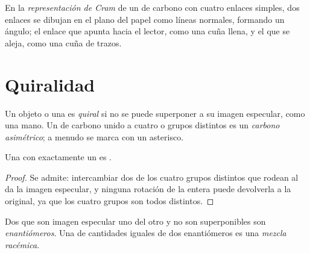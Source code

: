 \begin{definition}\label{def:g12:stereochemistry:cram}
En la \emph{representación de Cram} de un
 de carbono con cuatro enlaces simples, dos enlaces se dibujan en el
plano del papel como líneas normales, formando un ángulo; el enlace que
apunta hacia el lector, como una cuña llena, y el que se aleja, como una
cuña de trazos.
\end{definition}

\section{Quiralidad}

\begin{definition}\label{def:g12:stereochemistry:chiral}
Un objeto o una  es \emph{quiral} si no se puede
superponer a su imagen especular, como una mano. Un  de carbono
unido a cuatro  o grupos distintos es un \emph{carbono
asimétrico}; a menudo se marca con un
asterisco.
\end{definition}

\begin{proposition}\label{prop:g12:stereochemistry:one-carbon}
Una  con exactamente un  es .
\end{proposition}

\begin{proof}
Se admite: intercambiar dos de los cuatro grupos distintos que rodean al
 da la imagen especular, y ninguna rotación de la
 entera puede devolverla a la original, ya que los cuatro grupos
son todos distintos.
\end{proof}

\begin{definition}\label{def:g12:stereochemistry:enantiomer}
Dos  que son imagen especular uno del otro y no son
superponibles son \emph{enantiómeros}. Una  de
cantidades iguales de dos enantiómeros es una \emph{mezcla
racémica}.
\end{definition}

